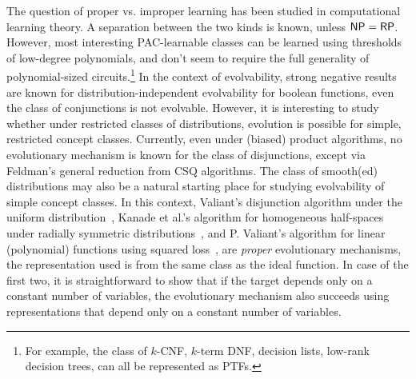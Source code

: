 The question of proper vs. improper learning has been studied in computational
learning theory. A separation between the two kinds is known, unless $\mathsf{NP} =
\mathsf{RP}$. However, most interesting PAC-learnable classes can be learned using
thresholds of low-degree polynomials, and don't seem to require the full
generality of polynomial-sized circuits.\footnote{For example, the class of
$k$-CNF, $k$-term DNF, decision lists, low-rank decision trees, can all be
represented as PTFs.} In the context of evolvability, strong negative results
are known for distribution-independent evolvability for boolean functions, \eg
even the class of conjunctions is not evolvable. However, it is interesting to
study whether under restricted classes of distributions, evolution is possible
for simple, restricted concept classes. Currently, even under (biased) product
algorithms, no evolutionary mechanism is known for the class of disjunctions,
except via Feldman's general reduction from CSQ algorithms. The class of
smooth(ed) distributions may also be a natural starting place for studying
evolvability of simple concept classes. In this context, Valiant's disjunction
algorithm under the uniform distribution~\cite{Valiant:2009-evolvability},
Kanade et al.'s algorithm for homogeneous half-spaces under radially symmetric
distributions~\cite{KVV:2010-drift}, and P. Valiant's algorithm for linear
(polynomial) functions using squared loss~\cite{Valiant:2012-real},
are \emph{proper} evolutionary mechanisms, \ie the
representation used is from the same class as the ideal function. In case of the
first two, it is straightforward to show that if the target depends only on a
constant number of variables, the evolutionary mechanism also succeeds using
representations that depend only on a constant number of variables.


